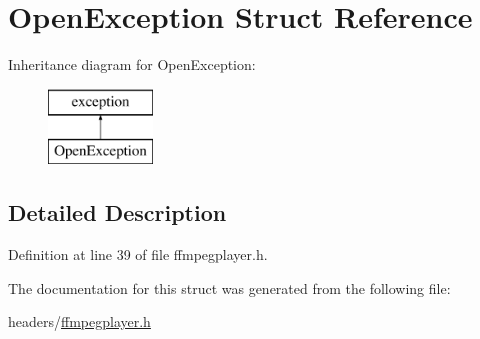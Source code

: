 \hypertarget{structOpenException}{}\section{Open\+Exception Struct Reference}
\label{structOpenException}
Inheritance diagram for Open\+Exception\+:\begin{figure}[H]
\begin{center}
\leavevmode
\includegraphics[height=2.000000cm]{structOpenException}
\end{center}
\end{figure}


\subsection{Detailed Description}


Definition at line 39 of file ffmpegplayer.\+h.



The documentation for this struct was generated from the following file\+:\begin{DoxyCompactItemize}
\item 
headers/\hyperlink{ffmpegplayer_8h}{ffmpegplayer.\+h}\end{DoxyCompactItemize}
